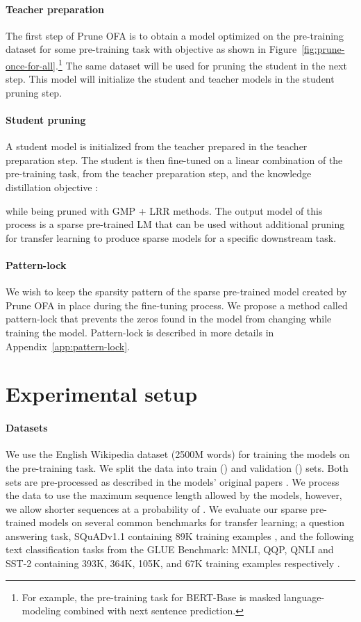 \documentclass{article}
\begin{document}
\paragraph{Teacher preparation}
The first step of Prune OFA is to obtain a model optimized on the pre-training dataset for some pre-training task with objective  as shown in Figure~\ref{fig:prune-once-for-all}.\footnote{For example, the pre-training task for BERT-Base is masked language-modeling combined with next sentence prediction.}
The same dataset will be used for pruning the student in the next step.
This model will initialize the student and teacher models in the student pruning step.

\paragraph{Student pruning}
A student model is initialized from the teacher prepared in the teacher preparation step.
The student is then fine-tuned on a linear combination of the pre-training task, from the teacher preparation step, and the knowledge  distillation objective :

while being pruned with GMP + LRR methods.
The output model of this process is a sparse pre-trained LM that can be used without additional pruning for transfer learning to produce sparse models for a specific downstream task.

\paragraph{Pattern-lock}
\label{sec:method-transfer}
We wish to keep the sparsity pattern of the sparse pre-trained model created by Prune OFA in place during the fine-tuning process.
We propose a method called pattern-lock that prevents the zeros found in the model from changing while training the model.
Pattern-lock is described in more details in Appendix~\ref{app:pattern-lock}.

\section{Experimental setup}
\label{sec:exp-setup}

\paragraph{Datasets}
\label{sec:datasets}
We use the English Wikipedia dataset (2500M words) for training the models on the pre-training task.
We split the data into train () and validation () sets.
Both sets are pre-processed as described in the models' original papers \citep{devlin2018bert, sanh2019distilbert}.
We process the data to use the maximum sequence length allowed by the models, however, we allow shorter sequences at a probability of .
We evaluate our sparse pre-trained models on several common benchmarks for transfer learning; a question answering task, SQuADv1.1 containing 89K training examples \citep{rajpurkar2016squad}, and the following text classification tasks from the GLUE Benchmark: MNLI, QQP, QNLI and SST-2 containing 393K, 364K, 105K, and 67K training examples respectively \citep{wang2018glue, williams2018mnli, iyer2017qqp, socher2013sst2}.
\end{document}
